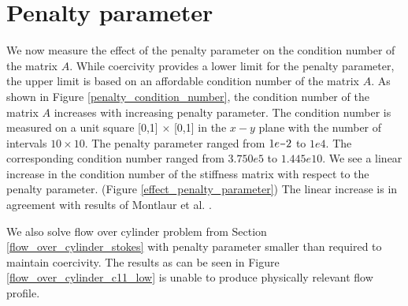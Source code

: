 \documentclass[a4paper,openany]{book}
\newcommand{\minus}{\scalebox{0.75}[1.0]{$-$}}
\begin{document}
\section{Penalty parameter}

We now measure the effect of the penalty parameter on the condition number of the matrix $A$. While coercivity provides a lower limit for the penalty parameter, the upper limit is based on an affordable condition number of the matrix $A$. As shown in Figure \ref{penalty_condition_number}, the condition number of the matrix $A$ increases with increasing penalty parameter.
The condition number is measured on a unit square [0,1] $\times$ [0,1] in the $x-y$ plane with the number of intervals $10 \times 10$. The penalty parameter ranged from $1e \minus 2$ to $1e4$. The corresponding condition number ranged from $3.750e5$ to $1.445e10$. We see a linear increase in the condition number of the stiffness matrix with respect to the penalty parameter. (Figure \ref{effect_penalty_parameter}) The linear increase is in agreement with results of Montlaur et al. \cite{Montlaur}.

We also solve flow over cylinder problem from Section \ref{flow_over_cylinder_stokes} with penalty parameter smaller than required to maintain coercivity. The results as can be seen in Figure \ref{flow_over_cylinder_c11_low} is unable to produce physically relevant flow profile.
\end{document}
